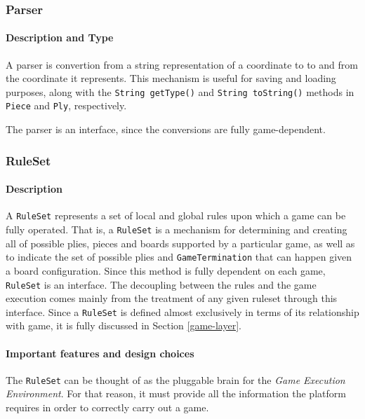 		\subsubsection{Parser}
			\paragraph{Description and Type} A parser is convertion from a string representation of a coordinate to 
											to and from the coordinate it represents. This mechanism is useful for saving and loading
											purposes, along with the \texttt{String getType()} and \texttt{String toString()} methods in 
											\texttt{Piece} and \texttt{Ply}, respectively.  
		
											The parser is an interface, since the conversions are fully game-dependent. 
											
		\subsubsection{RuleSet}
			\paragraph{Description} A \texttt{RuleSet} represents a set of local and global rules upon which a game can be
													fully operated. That is, a \texttt{RuleSet} is a mechanism for determining and creating all of 		
													possible plies, pieces and boards supported by a particular game, as well as to indicate the set of 
													possible plies and \texttt{GameTermination} that can happen given a board configuration. Since this
													method is fully dependent on each game, \texttt{RuleSet} is an interface. The decoupling between 
													the rules and the game execution comes mainly from the treatment of any given ruleset through 
													this interface. Since a \texttt{RuleSet} is defined almost exclusively in terms 
													of its relationship with game, it is fully discussed in Section \ref{game-layer}.   
			\paragraph{Important features and design choices} The \texttt{RuleSet} can be thought of as the 
													pluggable brain for the \emph{Game Execution Environment}. For that reason, 
													it must provide all the information the platform requires in order to correctly 
													carry out a game. 

